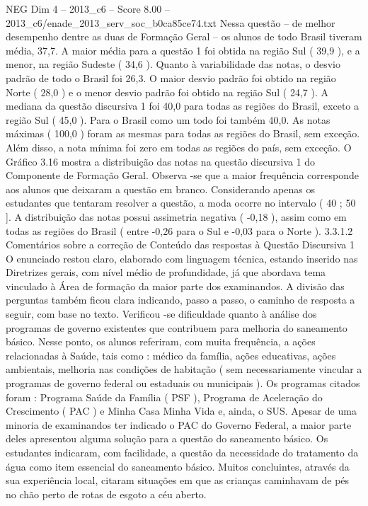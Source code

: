 \begin{textsample}{NEG Dim 4 – 2013\_c6 – Score 8.00 – 2013\_c6/enade\_2013\_serv\_soc\_b0ca85ce74.txt}
Nessa questão – de melhor desempenho dentre as duas de Formação Geral – os alunos de todo Brasil tiveram média, 37,7.
A maior média para a questão 1 foi obtida na região Sul ( 39,9 ), e a menor, na região Sudeste ( 34,6 ).
Quanto à variabilidade das notas, o desvio padrão de todo o Brasil foi 26,3.
O maior desvio padrão foi obtido na região Norte ( 28,0 ) e o menor desvio padrão foi obtido na região Sul ( 24,7 ).
A mediana da questão discursiva 1 foi 40,0 para todas as regiões do Brasil, exceto a região Sul ( 45,0 ).
Para o Brasil como um todo foi também 40,0.
As notas máximas ( 100,0 ) foram as mesmas para todas as regiões do Brasil, sem exceção.
Além disso, a nota mínima foi zero em todas as regiões do país, sem exceção.
O Gráfico 3.16 mostra a distribuição das notas na questão discursiva 1 do Componente de Formação Geral.
Observa -se que a maior frequência corresponde aos alunos que deixaram a questão em branco.
Considerando apenas os estudantes que tentaram resolver a questão, a moda ocorre no intervalo ( 40 ; 50 ].
A distribuição das notas possui assimetria negativa ( -0,18 ), assim como em todas as regiões do Brasil ( entre -0,26 para o Sul e -0,03 para o Norte ). 3.3.1.2 Comentários sobre a correção de Conteúdo das respostas à Questão Discursiva 1 O enunciado restou claro, elaborado com linguagem técnica, estando inserido nas Diretrizes gerais, com nível médio de profundidade, já que abordava tema vinculado à Área de formação da maior parte dos examinandos.
A divisão das perguntas também ficou clara indicando, passo a passo, o caminho de resposta a seguir, com base no texto.
Verificou -se dificuldade quanto à análise dos programas de governo existentes que contribuem para melhoria do saneamento básico.
Nesse ponto, os alunos referiram, com muita frequência, a ações relacionadas à Saúde, tais como : médico da família, ações educativas, ações ambientais, melhoria nas condições de habitação ( sem necessariamente vincular a programas de governo federal ou estaduais ou municipais ).
Os programas citados foram : Programa Saúde da Família ( PSF ), Programa de Aceleração do Crescimento ( PAC ) e Minha Casa Minha Vida e, ainda, o SUS.
Apesar de uma minoria de examinandos ter indicado o PAC do Governo Federal, a maior parte deles apresentou alguma solução para a questão do saneamento básico.
Os estudantes indicaram, com facilidade, a questão da necessidade do tratamento da água como item essencial do saneamento básico.
Muitos concluintes, através da sua experiência local, citaram situações em que as crianças caminhavam de pés no chão perto de rotas de esgoto a céu aberto.

\end{textsample}
